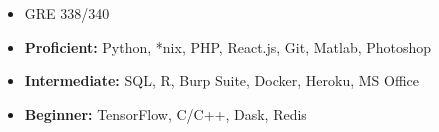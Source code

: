 \begin{cventries}
    \begin{itemize}
        \item {GRE 338/340}
        \item \textbf{Proficient:} Python, *nix, PHP, React.js, Git, Matlab, Photoshop
        \item \textbf{Intermediate:} SQL, R, Burp Suite, Docker, Heroku, MS Office
        \item \textbf{Beginner:} TensorFlow, C/C++, Dask, Redis
    \end{itemize}
\end{cventries}
